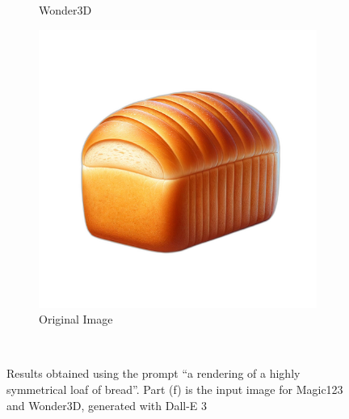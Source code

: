 \begin{figure}[ht]
\begin{subfigure}[b]{0.23\textwidth}
        \caption{Wonder3D}
        \vspace{0.1cm}
    \end{subfigure}
    \begin{subfigure}[b]{0.23\textwidth}
        \centering
        \includegraphics[width=\textwidth]{etc/Images/bread.png}
        \caption{Original Image}
        \vspace{0.1cm}
    \end{subfigure}
    \caption{Results obtained using the prompt ``a rendering of a highly symmetrical loaf of bread''. Part (f) is the input image for Magic123 and Wonder3D, generated with Dall-E 3}~\label{fig:resultBread}
\end{figure}


